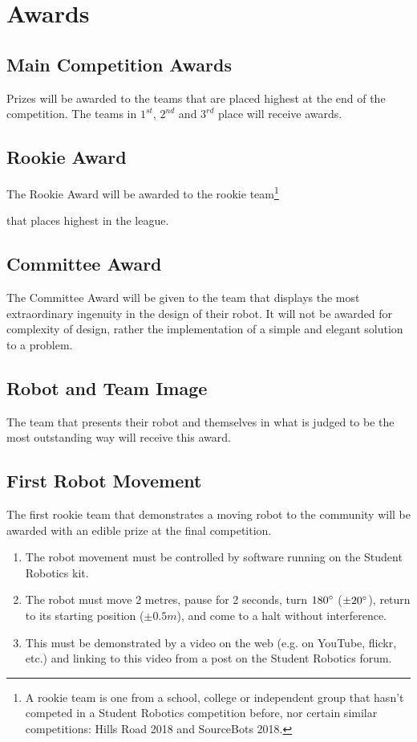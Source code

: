 \section {Awards}
\label{sec:Awards}

\subsection{Main Competition Awards}
Prizes will be awarded to the teams that are placed highest at the end of the competition.
The teams in $1^{st}$, $2^{nd}$ and $3^{rd}$ place will receive awards.

\subsection{Rookie Award}
The Rookie Award will be awarded to the rookie
team\footnote{A rookie team is one from a school, college or independent group that hasn't competed in a Student Robotics competition before, nor certain similar competitions: Hills Road 2018 and SourceBots 2018.}\addtocounter{footnote}{-1}\addtocounter{Hfootnote}{-1}
 that places highest in the league.

\subsection{Committee Award}
The Committee Award will be given to the team that displays the most extraordinary ingenuity in the design of their robot.
It will not be awarded for complexity of design, rather the implementation of a simple and elegant solution to a problem.

\subsection{Robot and Team Image}
The team that presents their robot and themselves in what is judged to be the most outstanding way will receive this award.

\subsection{First Robot Movement}
The first rookie team\footnotemark{} that demonstrates a moving robot to the community will be awarded with an edible prize at the final competition.
\begin{enumerate}
\item The robot movement must be controlled by software running on the Student Robotics kit.
\item The robot must move 2 metres, pause for 2 seconds, turn $180\degree$ ($\pm20\degree$), return to its starting position ($\pm0.5m$), and come to a halt without interference.
\item This must be demonstrated by a video on the web (e.g. on YouTube, flickr, etc.) and linking to this video from a post on the Student Robotics forum.
\end{enumerate}

